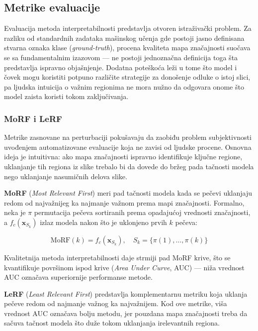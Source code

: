 \subsection{Metrike evaluacije}

Evaluacija metoda interpretabilnosti predstavlja otvoren istraživački problem. 
Za razliku od standardnih zadataka mašinskog učenja gde postoji jasno definisana 
stvarna oznaka klase (\textit{ground-truth}), procena kvaliteta mapa značajnosti suočava se sa 
fundamentalnim izazovom — ne postoji jednoznačna definicija toga šta predstavlja 
ispravno objašnjenje. Dodatna poteškoća leži u tome što model i čovek 
mogu koristiti potpuno različite strategije za donošenje odluke o istoj slici, 
pa ljudska intuicija o važnim regionima ne mora nužno da odgovara onome što model 
zaista koristi tokom zaključivanja.

\subsubsection{MoRF i LeRF}

Metrike zasnovane na perturbaciji \cite{samek2017evaluating} pokušavaju da 
zaobiđu problem subjektivnosti uvođenjem automatizovane evaluacije koja ne 
zavisi od ljudske procene. Osnovna ideja je intuitivna: ako mapa značajnosti 
ispravno identifikuje ključne regione, uklanjanje tih regiona iz slike trebalo 
bi da dovede do bržeg pada tačnosti modela nego uklanjanje nasumičnih delova slike.

\textbf{MoRF} (\textit{Most Relevant First}) meri pad tačnosti modela kada 
se pečevi uklanjaju redom od najvažnijeg ka najmanje važnom prema mapi 
značajnosti. Formalno, neka je $\pi$ permutacija pečeva sortiranih prema 
opadajućoj vrednosti značajnosti, a $f_c(\mathbf{x}_{S_k})$ izlaz modela 
nakon što je uklonjeno prvih $k$ pečeva:

\begin{equation}
    \text{MoRF}(k) = f_c(\mathbf{x}_{S_k}), \quad 
    S_k = \{\pi(1), \ldots, \pi(k)\}
\end{equation}

Kvalitetnija metoda interpretabilnosti daje strmiji pad MoRF krive, što se 
kvantifikuje površinom ispod krive (\textit{Area Under Curve}, AUC) — 
niža vrednost AUC označava superiornije performanse metode.

\textbf{LeRF} (\textit{Least Relevant First}) predstavlja komplementarnu metriku 
koja uklanja pečeve redom od najmanje važnog ka najvažnijem. Kod ove metrike, 
viša vrednost AUC označava bolju metodu, jer pouzdana mapa značajnosti treba da sačuva 
tačnost modela što duže tokom uklanjanja irelevantnih regiona.

